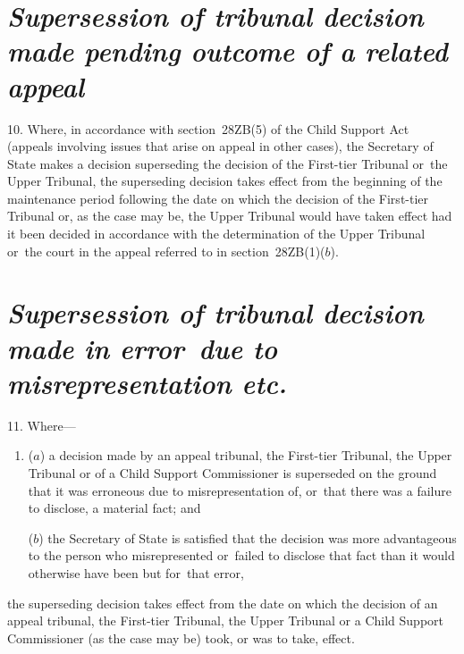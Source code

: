 \documentclass[12pt,a4paper]{article}
\begin{document}
\section*{\itshape\sloppy{} Supersession of tribunal decision made pending outcome of a related appeal}

10.  Where, in accordance with section~28ZB(5) of the Child Support Act (appeals involving issues that arise on appeal in other cases), the 
Secretary of State  %
makes a decision superseding the decision of the First-tier Tribunal or~the Upper Tribunal, the superseding decision takes effect from the beginning of the maintenance period following the date on which the decision of the First-tier Tribunal or, as the case may be, the Upper Tribunal would have taken effect had it been decided in accordance with the determination of the Upper Tribunal or~the court in the appeal referred to in section~28ZB(1)($b$).


\section*{\itshape\sloppy{}  Supersession of tribunal decision made in error~due to misrepresentation etc.}

11.  Where—
\begin{enumerate}\item[]
($a$) a decision made by 
an appeal tribunal, the First-tier Tribunal, the Upper Tribunal or of a Child Support Commissioner  %
is superseded on the ground that it was erroneous due to misrepresentation of, or~that there was a failure to disclose, a material fact; and

($b$) the 
Secretary of State  %
is satisfied that the decision was more advantageous to the person who misrepresented or~failed to disclose that fact than it would otherwise have been but for~that error,
\end{enumerate}
the superseding decision takes effect from the date on which the decision of 
an appeal tribunal, the First-tier Tribunal, the Upper Tribunal or a Child Support Commissioner (as the case may be)  %
took, or was to take, effect.
\end{document}
